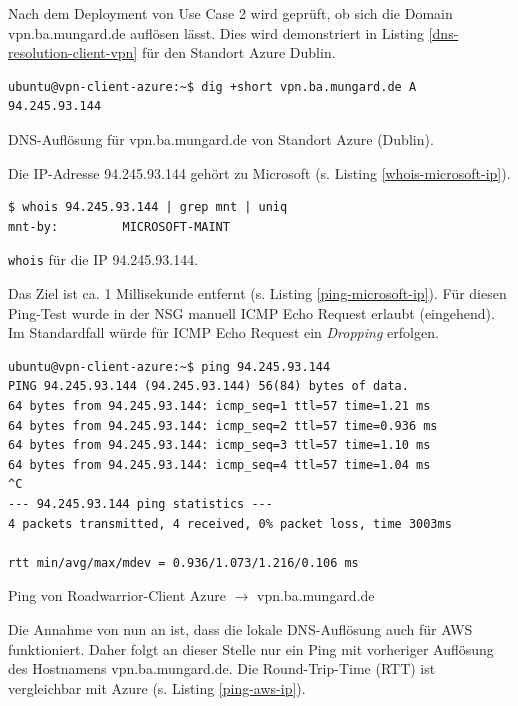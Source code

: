 Nach dem \gls{Deployment} von Use Case 2 wird geprüft, ob sich die Domain vpn.ba.mungard.de auflösen lässt. Dies wird demonstriert in Listing \ref{dns-resolution-client-vpn} für den Standort Azure Dublin.
\begin{listing}[h]
\begin{verbatim}
ubuntu@vpn-client-azure:~$ dig +short vpn.ba.mungard.de A
94.245.93.144

\end{verbatim}
\caption{DNS-Auflösung für vpn.ba.mungard.de von Standort Azure (Dublin).}
\label{dns-resolution-client-vpn}
\end{listing}\FloatBarrier
Die IP-Adresse 94.245.93.144 gehört zu Microsoft (s. Listing \ref{whois-microsoft-ip}).
\begin{listing}[h]
\begin{verbatim}
$ whois 94.245.93.144 | grep mnt | uniq
mnt-by:         MICROSOFT-MAINT

\end{verbatim}
\caption{\texttt{whois} für die IP 94.245.93.144.}
\label{whois-microsoft-ip}
\end{listing}\FloatBarrier
Das Ziel ist ca. 1 Millisekunde entfernt (s. Listing \ref{ping-microsoft-ip}). Für diesen Ping-Test wurde in der \gls{NSG} manuell \gls{ICMP} Echo Request erlaubt (eingehend). Im Standardfall würde für \gls{ICMP} Echo Request ein \textit{Dropping} erfolgen.
\begin{listing}[h]
\begin{verbatim}
ubuntu@vpn-client-azure:~$ ping 94.245.93.144
PING 94.245.93.144 (94.245.93.144) 56(84) bytes of data.
64 bytes from 94.245.93.144: icmp_seq=1 ttl=57 time=1.21 ms
64 bytes from 94.245.93.144: icmp_seq=2 ttl=57 time=0.936 ms
64 bytes from 94.245.93.144: icmp_seq=3 ttl=57 time=1.10 ms
64 bytes from 94.245.93.144: icmp_seq=4 ttl=57 time=1.04 ms
^C
--- 94.245.93.144 ping statistics ---
4 packets transmitted, 4 received, 0% packet loss, time 3003ms

rtt min/avg/max/mdev = 0.936/1.073/1.216/0.106 ms

\end{verbatim}
\caption{Ping von Roadwarrior-Client Azure $\rightarrow$ vpn.ba.mungard.de}
\label{ping-microsoft-ip}
\end{listing}\FloatBarrier
Die Annahme von nun an ist, dass die lokale \gls{DNS}-Auflösung auch für AWS funktioniert. Daher folgt an dieser Stelle nur ein Ping mit vorheriger Auflösung des Hostnamens vpn.ba.\-mun\-gard.de. Die Round-Trip-Time (RTT) ist vergleichbar mit Azure (s. Listing \ref{ping-aws-ip}).

